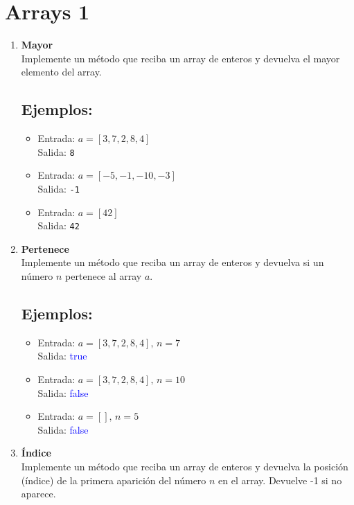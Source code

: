 \section{Arrays 1}
\begin{enumerate}
    \item \textbf{Mayor}\\
    Implemente un método que reciba un array de enteros y devuelva el mayor elemento del array.
    \subsection*{Ejemplos:}
    \begin{itemize}
        \item Entrada: \( a = [3, 7, 2, 8, 4] \)\\
        Salida: \texttt{8}
        
        \item Entrada: \( a = [-5, -1, -10, -3] \)\\
        Salida: \texttt{-1}
        
        \item Entrada: \( a = [42] \)\\
        Salida: \texttt{42}
    \end{itemize}
    
    \item \textbf{Pertenece}\\
     Implemente un método que reciba un array de enteros y devuelva si un número \(n\) pertenece al array \(a\).
     \subsection*{Ejemplos:}
     \begin{itemize}
        \item Entrada: \( a = [3, 7, 2, 8, 4], \, n = 7 \)\\
        Salida: \textcolor{blue}{true} 
        
        \item Entrada: \( a = [3, 7, 2, 8, 4], \, n = 10 \)\\
        Salida: \textcolor{blue}{false}
        
        \item Entrada: \( a = [], \, n = 5 \)\\
        Salida: \textcolor{blue}{false}
    \end{itemize}
     
    \item \textbf{Índice}\\
     Implemente un método que reciba un array de enteros y devuelva la posición (índice) de la primera aparición del número \(n\) en el array. Devuelve -1 si no aparece.

\end{enumerate}
